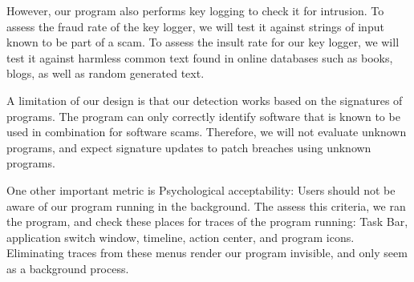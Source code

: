 \documentclass[final]{IEEEtran}
\begin{document}
However, our program also performs key logging to check it for intrusion.
To assess the fraud rate of the key logger, we will test it against strings of input known to be part of a scam.
To assess the insult rate for our key logger, we will test it against harmless common text found in online databases such as books, blogs, as well as random generated text.

A limitation of our design is that our detection works based on the signatures of programs. The program can only correctly identify software that is known to be used in combination for software scams. Therefore, we will not evaluate unknown programs, and expect signature updates to patch breaches using unknown programs.

One other important metric is Psychological acceptability: Users should not be aware of our program running in the background.
The assess this criteria, we ran the program, and check these places for traces of the program running: Task Bar, application switch window, timeline, action center, and program icons. Eliminating traces from these menus render our program invisible, and only seem as a background process.










\end{document}
